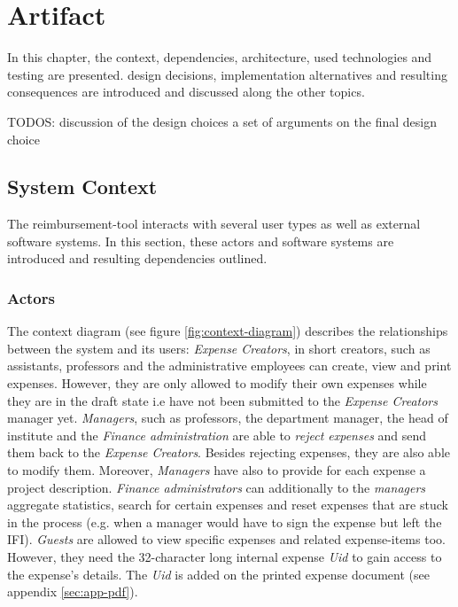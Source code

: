 \chapter{Artifact}

In this chapter, the context, dependencies, architecture, used technologies and testing are presented. design decisions, implementation alternatives and resulting consequences are introduced and discussed along the other topics.


TODOS:
discussion of the design choices  a set of arguments on the final design choice



\section{System Context}

The reimbursement-tool interacts with several user types as well as external software systems. In this section, these actors and software systems are introduced and resulting dependencies outlined.

\subsection{Actors}

The context diagram (see figure \ref{fig:context-diagram}) describes the relationships between the system and its users:
\textit{Expense Creators}, in short creators, such as assistants, professors and the administrative employees can create, view and print expenses. However, they are only allowed to modify their own expenses while they are in the draft state i.e have not been submitted to the \textit{Expense Creators} manager yet.  \textit{Managers}, such as professors, the department manager, the head of institute and the \textit{Finance administration} are able to \textit{reject expenses} and send them back to the \textit{Expense Creators}. Besides rejecting expenses, they are also able to modify them. Moreover, \textit{Managers} have also to provide for each expense a project description. \textit{Finance administrators} can additionally to the \textit{managers} aggregate statistics, search for certain expenses and reset expenses that are stuck in the process (e.g. when a manager would have to sign the expense but left the IFI). \textit{Guests} are allowed to view specific expenses and related expense-items too. However, they need the 32-character long internal expense \textit{Uid} to gain access to the expense's details. The \textit{Uid} is added on the printed expense document (see appendix \ref{sec:app-pdf}).

